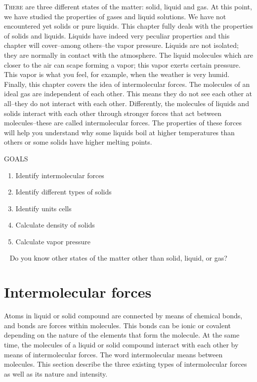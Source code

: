 \documentclass[main.tex]{subfiles}
\begin{document}
\lettrine[lines=4]{\color{black!45}T}{here} are three different states of the matter: solid, liquid and gas. At this point, we have studied the properties of gases and liquid solutions. We have not encountered yet solids or pure liquids. This chapter fully deals with the properties of solids and liquids. Liquids have indeed very peculiar properties and this chapter will cover--among others--the vapor pressure. Liquids are not isolated; they are normally in contact with the atmosphere. The liquid molecules which are closer to the air can scape forming a vapor; this vapor exerts certain pressure. This vapor is what you feel, for example, when the weather is very humid. Finally, this chapter covers the idea of intermolecular forces. The molecules of an ideal gas are independent of each other. This means they do not see each other at all--they do not interact with each other. Differently, the molecules of liquids and solids interact with each other through stronger forces that act between molecules--these are called intermolecular forces. The properties of these forces will help you understand why some liquids boil at higher temperatures than others or some solids have higher melting points.  
\begin{marginfigure}%
\begin{mytcbox}{GOALS}
\begin{enumerate}[label=\protect\circled{\color{white}\arabic*}]
\item Identify intermolecular forces
\item Identify different types of solids
\item Identify units cells
\item Calculate density of solids
\item Calculate vapor pressure
\end{enumerate}
\end{mytcbox}
\vspace{1cm}
\begin{tcolorbox}[enhanced,colback=red!5!white,colframe=black!50!red,boxrule=1pt,
  arc=0pt,outer arc=0pt,drop heavy lifted shadow]
\faGears\ 
 Do you know other states of the matter other than solid, liquid, or gas?

  \end{tcolorbox}
\end{marginfigure}%



\section{Intermolecular forces}
Atoms in liquid or solid compound are connected by means of chemical bonds, and bonds are forces within molecules. This bonds can be ionic or covalent depending on the nature of the elements that form the molecule. At the same time, the molecules of a liquid or solid compound interact with each other by means of intermolecular forces. The word intermolecular means between molecules. This section describe the three existing types of intermolecular forces as well as its nature and intensity.
\end{document}
